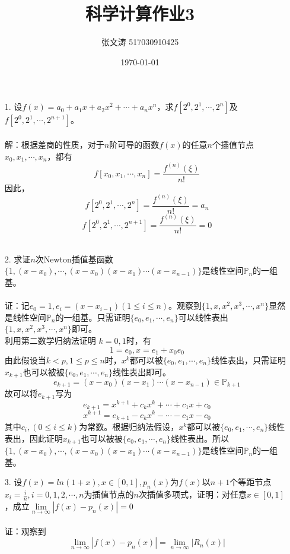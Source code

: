 \documentclass{article}
\title{科学计算作业3}
\author{张文涛 517030910425}
\date{\today}
\begin{document}
	\maketitle
	\begin{itemize}
		\item[1.]设$f(x) = a_{0} + a_{1}x + a_{2}x^{2} + \cdots + a_{n}x^{n}$，求$f[2^{0}, 2^{1}, \cdots, 2^{n}]$及$f[2^{0}, 2^{1}, \cdots, 2^{n + 1}]$。\\\\
		解：根据差商的性质，对于$n$阶可导的函数$f(x)$的任意$n$个插值节点$x_{0}, x_{1},\cdots, x_{n}$，都有
		$$f[x_{0}, x_{1}, \cdots, x_{n}] = \frac{f^{(n)}(\xi)}{n!}$$
		因此，
		$$f[2^{0}, 2^{1}, \cdots, 2^{n}] =\frac{f^{(n)}(\xi)}{n!} =a_{n}$$
		$$f[2^{0}, 2^{1}, \cdots, 2^{n+1}] =\frac{f^{(n)}(\xi)}{n!} = 0$$\\
		\item[2.]求证$n$次Newton插值基函数$\{1,(x-x_{0}), \cdots, (x - x_{0})(x - x_{1})\cdots(x - x_{n-1})\}$是线性空间$\mathbb{P}_{n}$的一组基。\\\\
		证：记$e_{0} = 1, e_{i} = (x - x_{i - 1})(1\le i\le n)$。观察到$\{1, x, x^2, x^3, \cdots, x^n\}$显然是线性空间$\mathbb{P}_{n}$的一组基。只需证明$\{e_{0},e_{1}, \cdots, e_{n}\}$可以线性表出$\{1, x, x^2, x^3, \cdots, x^n\}$即可。\\
		利用第二数学归纳法证明
		$k = 0, 1$时，有
		$$1 = e_{0}, x = e_{1} + x_{0}e_{0}$$
		由此假设当$k < p, 1 \le p \le n$时，$x^{k}$都可以被$\{e_{0},e_{1}, \cdots, e_{n}\}$线性表出，只需证明$x_{k+1}$也可以被被$\{e_{0},e_{1}, \cdots, e_{n}\}$线性表出即可。
		$$e_{k+1}=(x-x_{0})(x - x_{1})\cdots(x - x_{n-1}) \in \mathbb{P}_{k+1}$$
		故可以将$e_{k+1}$写为
		$$e_{k+1} = x^{k+1} + c_{k}x^{k} + \cdots +c_{1}x +c_{0}$$
		$$x^{k+1} =e_{k+1}  - c_{k}x^{k} - \cdots -c_{1}x -c_{0}$$
		其中$c_{i}, (0 \le i \le k)$为常数。根据归纳法假设，$x^{k}$都可以被$\{e_{0},e_{1}, \cdots, e_{n}\}$线性表出，因此证明$x_{k+1}$也可以被被$\{e_{0},e_{1}, \cdots, e_{n}\}$线性表出。所以$\{1,(x-x_{0}), \cdots, (x - x_{0})(x - x_{1})\cdots(x - x_{n-1})\}$是线性空间$\mathbb{P}_{n}$的一组基。\\
		\item[3.]设$f(x)=ln(1+x),x\in [ 0, 1],p_{n}(x)$为$f(x)$以$n+1$个等距节点$x_{i} = \frac{i}{n},i = 0, 1, 2, \cdots, n$为插值节点的$n$次插值多项式，证明：对任意$x\in [0,1]$，成立$\lim\limits_{n\rightarrow \infty} \left|f(x)-p_{n}(x)\right|=0$\\\\
		证：观察到$$\lim\limits_{n\rightarrow \infty} \left|f(x)-p_{n}(x)\right|=\lim\limits_{n\rightarrow \infty}\left|R_{n}(x)\right|$$

\end{itemize}
\end{document}
